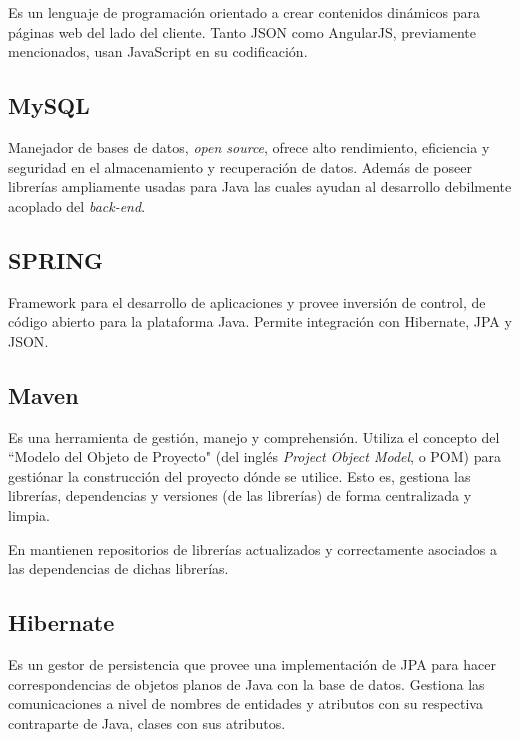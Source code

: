         Es un lenguaje de programación orientado a crear contenidos dinámicos para páginas web del lado del cliente. Tanto JSON como AngularJS, previamente mencionados, usan JavaScript en su codificación.
        
        \subsection{MySQL}
        \label{tecno-mysql}
        
        Manejador de bases de datos, \textit{open source}, ofrece alto rendimiento, eficiencia y seguridad en el almacenamiento y recuperación de datos\cite{MYSQL-oracle}. Además de poseer librerías ampliamente usadas para Java las cuales ayudan al desarrollo debilmente acoplado del \textit{back-end}.
        
        \subsection{SPRING}
        \label{tecno-spring}
        
        Framework para el desarrollo de aplicaciones y provee inversión de control, de código abierto para la plataforma Java. Permite integración con Hibernate, JPA y JSON\cite{SPRING-essential}.
        
        \subsection{Maven}
        \label{tecno-maven}
        
        Es una herramienta de gestión, manejo y comprehensión. Utiliza el concepto del ``Modelo del Objeto de Proyecto" (del inglés \textit{Project Object Model}, o POM) para gestiónar la construcción del proyecto dónde se utilice. Esto es, gestiona las librerías, dependencias y versiones (de las librerías) de forma centralizada y limpia.
        
        En \cite{APACHE-maven} mantienen repositorios de librerías actualizados y correctamente asociados a las dependencias de dichas librerías.
        
        \subsection{Hibernate}
        \label{tecno-hibernate}
        
        Es un gestor de persistencia que provee una implementación de JPA para hacer correspondencias de objetos planos de Java con la base de datos\cite{HIBERNATE-basico}. Gestiona las comunicaciones a nivel de nombres de entidades y atributos con su respectiva contraparte de Java, clases con sus atributos.
        
